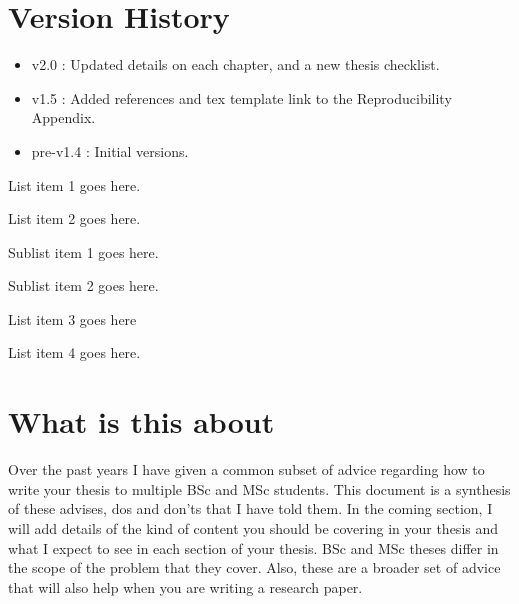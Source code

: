 \documentclass[11pt]{article}
\begin{document}
\newpage



% 
\tableofcontents
\newpage 
\section*{Version History}
\begin{itemize}
    \item v2.0     : Updated details on each chapter, and a new thesis checklist.
    \item v1.5     : Added references and tex template link to the Reproducibility Appendix. 
    \item pre-v1.4 : Initial versions. 
\end{itemize}

\newpage 
  \begin{todolist}
    \item List item 1 goes here.
    \item List item 2 goes here.
    \begin{todolist}
      \item Sublist item 1 goes here.
      \item Sublist item 2 goes here.
    \end{todolist}
    \item List item 3 goes here
    \item List item 4 goes here.
  \end{todolist}

\newpage 
\section*{What is this about}
Over the past years I have given a common subset of advice regarding how to write your thesis to multiple BSc and MSc students. This document is a synthesis of these advises, dos and don'ts that I have told them. In the coming section, I will add details of the kind of content you should be covering in your thesis and what I expect to see in each section of your thesis. BSc and MSc theses differ in the scope of the problem that they cover. Also, these are a broader set of advice that will also help when you are writing a research paper. 
\end{document}
